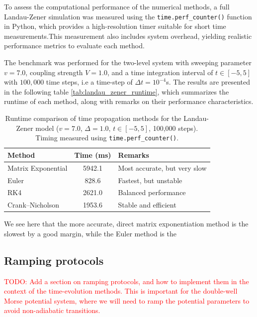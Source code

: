\documentclass{subfiles}
\begin{document}
To assess the computational performance of the numerical methods, a full Landau-Zener simulation was measured using the \texttt{time.perf\_counter()} function in Python, which provides a high-resolution timer suitable for short time measurements.This measurement also includes system overhead, yielding realistic performance metrics to evaluate each method. 

The benchmark was performed for the two-level system with sweeping parameter $v=7.0$, coupling strength $V=1.0$, and a time integration interval of $t \in [-5, 5]$ with $100{,}000$ time steps, i.e a time-step of $\Delta t = 10^{-4}$s. The results are presented in the following table \eqref{tab:landau_zener_runtime}, which summarizes the runtime of each method, along with remarks on their performance characteristics.

\begin{table}[h!]
\centering
\caption{Runtime comparison of time propagation methods for the Landau-Zener model ($v = 7.0$, $\Delta = 1.0$, $t \in [-5, 5]$, 100,000 steps). Timing measured using \texttt{time.perf\_counter()}.}
\begin{tabular}{l c l}
\toprule
\textbf{Method} & \textbf{Time (ms)} & \textbf{Remarks} \\
\midrule
Matrix Exponential & 5942.1 & Most accurate, but very slow \\
Euler              & 828.6  & Fastest, but unstable \\
RK4                & 2621.0 & Balanced performance \\
Crank--Nicholson   & 1953.6 & Stable and efficient \\
\bottomrule
\end{tabular}\label{tab:landau_zener_runtime}
\end{table}
We see here that the more accurate, direct matrix exponentiation method is the slowest by a good margin, while the Euler method is the

\subsection{Ramping protocols}
\textcolor{red}{TODO: Add a section on ramping protocols, and how to implement them in the context of the time-evolution methods. This is important for the double-well Morse potential system, where we will need to ramp the potential parameters to avoid non-adiabatic transitions.} \\\\
\end{document}
